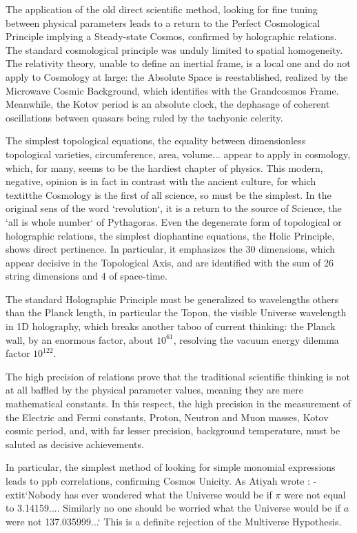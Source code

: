 \documentclass[twoside,draft]{article}
\begin{document}
\begin{sloppypar}
The application of the old direct scientific method, looking for fine tuning between physical
parameters leads to a return to the Perfect Cosmological Principle implying a Steady-state Cosmos,
confirmed by holographic relations. The standard cosmological principle was unduly limited to
spatial homogeneity. The relativity theory, unable to define an inertial frame, is a local one and do
not apply to Cosmology at large: the Absolute Space is reestablished, realized by the Microwave
Cosmic Background, which identifies with the Grandcosmos Frame. Meanwhile, the Kotov period is an
absolute clock, the dephasage of coherent oscillations between quasars being ruled by the tachyonic celerity.

The simplest topological equations, the equality between dimensionless topological varieties,
circumference, area, volume... appear to apply in cosmology, which, for many, seems to be the hardiest
chapter of physics. This modern, negative, opinion is in fact in contrast with the ancient culture, for
which textit{the Cosmology is the first of all science, so must be the simplest}. In the original sens of the
word `revolution`, it is a return to the source of Science, the `all is whole number` of Pythagoras.
Even the degenerate form of topological or holographic relations, the simplest diophantine
equations, the Holic Principle, shows direct pertinence. In particular, it emphasizes the 30
dimensions, which appear decisive in the Topological Axis, and are identified with the sum of 26 string
dimensions and 4 of space-time.

The standard Holographic Principle must be generalized to wavelengths others than the Planck
length, in particular the Topon, the visible Universe wavelength in 1D holography, which breaks
another taboo of current thinking: the Planck wall, by an enormous factor, about $10^{61}$, resolving the
vacuum energy dilemma factor $10^{122}$.

The high precision of relations prove that the traditional scientific thinking is not at all baffled by
the physical parameter values, meaning they are mere mathematical constants. In this respect, the
high precision in the measurement of the Electric and Fermi constants, Proton, Neutron and Muon masses, Kotov cosmic period, and, with far lesser precision, background temperature, must be saluted as decisive achievements.

In particular, the simplest method of looking for simple monomial expressions leads to ppb correlations, confirming Cosmos Unicity. As Atiyah wrote \cite{Atiya1}: -extit{`Nobody has
ever wondered what the Universe would be if $\pi$ were not equal to 3.14159.... Similarly no one
should be worried what the Universe would be if $a$ were not 137.035999...}` This is a definite
rejection of the Multiverse Hypothesis.


\end{sloppypar}
\end{document}
